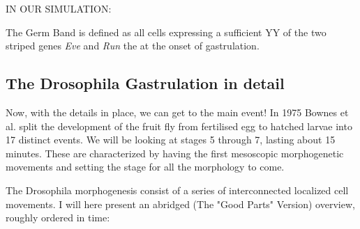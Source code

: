 IN OUR SIMULATION: 

The Germ Band is defined as all cells expressing a sufficient YY of the two striped genes \textit{Eve} and \textit{Run} the at the onset of gastrulation. \cite{zallen2004patterned}
\subsection{The Drosophila Gastrulation in detail}
Now, with the details in place, we can get to the main event!
In 1975 Bownes et al. split the development of the fruit fly from fertilised egg to hatched larvae into 17 distinct events. \cite{bownes1975photographic} We will be looking at stages 5 through 7, lasting about 15 minutes. These are characterized by having the first mesoscopic morphogenetic movements and setting the stage for all the morphology to come. 

The Drosophila morphogenesis consist of a series of interconnected localized cell movements. I will here present an abridged (The "Good Parts" Version) overview, roughly ordered in time:
\newpage

